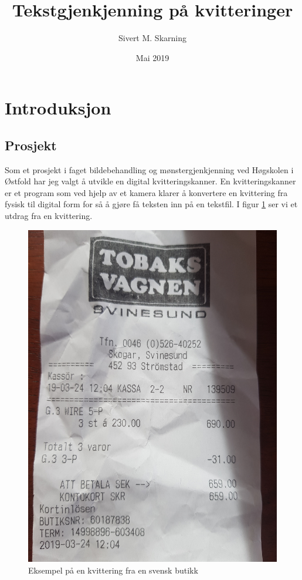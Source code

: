 \documentclass{article}
\title{Tekstgjenkjenning på kvitteringer}
\author{Sivert M. Skarning}
\date{Mai 2019}
\begin{document}
\maketitle
\clearpage
\tableofcontents
\clearpage
\section{Introduksjon}
\subsection{Prosjekt}
Som et prosjekt i faget bildebehandling og mønstergjenkjenning ved Høgskolen i Østfold har jeg valgt å utvikle en digital kvitteringskanner. En kvitteringskanner er et program som ved hjelp av et kamera klarer å konvertere en kvittering fra fysisk til digital form for så å gjøre få teksten inn på en tekstfil. I figur \ref{fig:kvittering} ser vi et utdrag fra en kvittering.

\begin{figure}[h]
\centering
\includegraphics[scale=0.05, angle=-90]{images/kvittering.jpg}
\caption{Eksempel på en kvittering fra en svensk butikk}
\label{fig:kvittering}
\end{figure}
\end{document}
